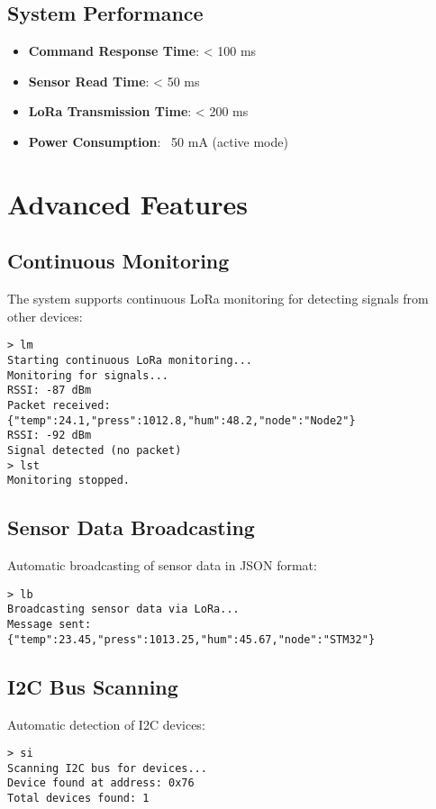 \documentclass[11pt,a4paper]{article}
\begin{document}
\subsection{System Performance}
\begin{itemize}
    \item \textbf{Command Response Time}: < 100 ms
    \item \textbf{Sensor Read Time}: < 50 ms
    \item \textbf{LoRa Transmission Time}: < 200 ms
    \item \textbf{Power Consumption}: ~50 mA (active mode)
\end{itemize}

\section{Advanced Features}

\subsection{Continuous Monitoring}
The system supports continuous LoRa monitoring for detecting signals from other devices:

\begin{lstlisting}[caption=Continuous Monitoring]
> lm
Starting continuous LoRa monitoring...
Monitoring for signals...
RSSI: -87 dBm
Packet received: {"temp":24.1,"press":1012.8,"hum":48.2,"node":"Node2"}
RSSI: -92 dBm
Signal detected (no packet)
> lst
Monitoring stopped.
\end{lstlisting}

\subsection{Sensor Data Broadcasting}
Automatic broadcasting of sensor data in JSON format:

\begin{lstlisting}[caption=Sensor Data Broadcast]
> lb
Broadcasting sensor data via LoRa...
Message sent: {"temp":23.45,"press":1013.25,"hum":45.67,"node":"STM32"}
\end{lstlisting}

\subsection{I2C Bus Scanning}
Automatic detection of I2C devices:

\begin{lstlisting}[caption=I2C Bus Scan]
> si
Scanning I2C bus for devices...
Device found at address: 0x76
Total devices found: 1
\end{lstlisting}
\end{document}
